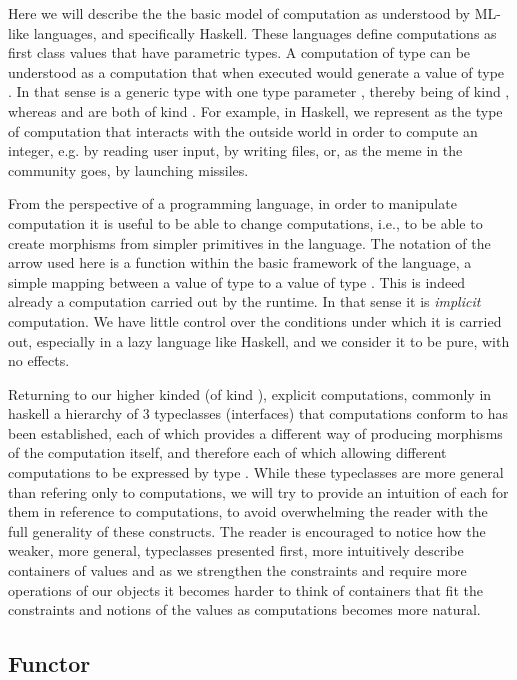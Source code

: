 Here we will describe the the basic model of computation as understood
by ML-like languages, and specifically Haskell. These languages define
computations as first class values that have parametric types. A
computation of type  can be understood as a computation that
when executed would generate a value of type . In that sense
 is a generic type with one type parameter , thereby
being of kind \hask{* -> *}, whereas  and  are both
of kind \hask{*}. For example, in Haskell, we represent as  the type of computation that interacts with the outside world
in order to compute an integer, e.g. by reading user input, by writing
files, or, as the meme in the community goes, by launching missiles.

From the perspective of a programming language, in order to manipulate
computation it is useful to be able to change computations, i.e., to
be able to create morphisms  from simpler primitives
in the language. The notation of the arrow \hask{->} used here is a
function within the basic framework of the language, a simple mapping
between a value of type  to a value of type . This
is indeed already a computation carried out by the runtime.  In that
sense it is \emph{implicit} computation. We have little control over
the conditions under which it is carried out, especially in a lazy
language like Haskell, and we consider it to be pure, with no
effects. 

Returning to our higher kinded (of kind \hask{* -> *}), explicit
computations, commonly in haskell a hierarchy of 3 typeclasses
(interfaces) that computations conform to has been established, each
of which provides a different way of producing morphisms of the
computation itself, and therefore each of which allowing different
computations to be expressed by type . While these typeclasses are
more general than refering only to computations, we will try to
provide an intuition of each for them in reference to computations, to
avoid overwhelming the reader with the full generality of these
constructs. The reader is encouraged to notice how the weaker, more
general, typeclasses presented first, more intuitively describe
containers of values and as we strengthen the constraints and require
more operations of our objects it becomes harder to think of
containers that fit the constraints and notions of the values as
computations becomes more natural.

\subsection{Functor}

